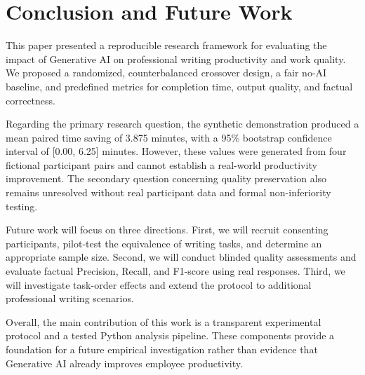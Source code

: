 
\section{Conclusion and Future Work}
\label{sec:conclusion}

This paper presented a reproducible research framework
for evaluating the impact of Generative AI on professional
writing productivity and work quality. We proposed a
randomized, counterbalanced crossover design, a fair
no-AI baseline, and predefined metrics for completion
time, output quality, and factual correctness.

Regarding the primary research question, the synthetic
demonstration produced a mean paired time saving of
3.875 minutes, with a 95\% bootstrap confidence interval
of [0.00, 6.25] minutes. However, these values were
generated from four fictional participant pairs and
cannot establish a real-world productivity improvement.
The secondary question concerning quality preservation
also remains unresolved without real participant data
and formal non-inferiority testing.

Future work will focus on three directions. First,
we will recruit consenting participants, pilot-test
the equivalence of writing tasks, and determine an
appropriate sample size. Second, we will conduct
blinded quality assessments and evaluate factual
Precision, Recall, and F1-score using real responses.
Third, we will investigate task-order effects and
extend the protocol to additional professional
writing scenarios.

Overall, the main contribution of this work is a
transparent experimental protocol and a tested
Python analysis pipeline. These components provide
a foundation for a future empirical investigation
rather than evidence that Generative AI already
improves employee productivity.
